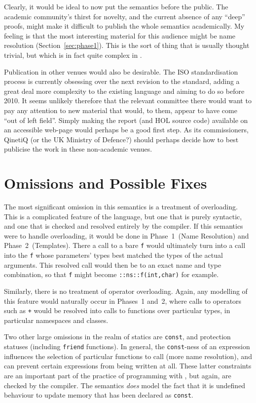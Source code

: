 \documentclass[11pt]{article}
\begin{document}
Clearly, it would be ideal to now put the \cpp{} semantics before the
public.  The academic community's thirst for novelty, and the current
absence of any ``deep'' proofs, might make it difficult to publish the
whole semantics academically.  My feeling is that the most interesting
material for this audience might be name resolution
(Section~\ref{sec:phase1}). This is the sort of thing that is usually
thought trivial, but which is in fact quite complex in \cpp{}.

Publication in other venues would also be desirable.  The ISO
standardisation process is currently obsessing over the next revision
to the standard, adding a great deal more complexity to the existing
language and aiming to do so before 2010.  It seems unlikely therefore
that the relevant committee there would want to pay any attention to
new material that would, to them, appear to have come ``out of left
field''.  Simply making the report (and HOL source code) available on
an accessible web-page would perhaps be a good first step.  As its
commissioners, QinetiQ (or the UK Ministry of Defence?) should perhaps
decide how to best publicise the work in these non-academic venues.



\section{Omissions and Possible Fixes}
\label{sec:omissions}

 The most significant omission in this semantics is
a treatment of overloading.  This is a complicated feature of the
language, but one that is purely syntactic, and one that is checked
and resolved entirely by the compiler.  If this semantics were to
handle overloading, it would be done in Phase~1~(Name Resolution) and
Phase~2~(Templates).  There a call to a bare \texttt{f} would
ultimately turn into a call into the \texttt{f} whose parameters'
types best matched the types of the actual arguments.  This resolved
call would then be to an exact name and type combination, so that
\texttt{f} might become \texttt{::ns::f(int,char)} for example.

Similarly, there is no treatment of operator overloading.  Again, any
modelling of this feature would naturally occur in Phases~1 and~2,
where calls to operators such as \texttt{+} would be resolved into
calls to functions over particular types, in particular namespaces and
classes.

Two other large omissions in the realm of statics are \texttt{const},
and protection statuses (including \texttt{friend} functions).  In
general, the \texttt{const}-ness of an expression influences the
selection of particular functions to call (more name resolution), and
can prevent certain expressions from being written at all.  These
latter constraints are an important part of the practice of
programming with \cpp{}, but again, are checked by the compiler.  The
semantics \emph{does} model the fact that it is undefined behaviour to
update memory that has been declared as \texttt{const}.
\end{document}
